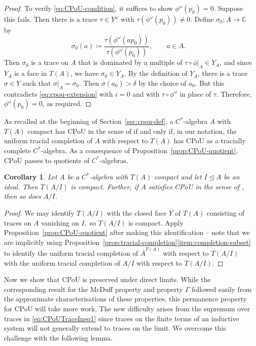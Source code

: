 \documentclass[a4paper,11pt]{amsart}
\newtheorem{corollary}[theorem]{Corollary}
\theoremstyle{definition}
\numberwithin{equation}{section}
\numberwithin{theorem}{section}
\newcommand{\completion}[2]{\overline{#1}^{#2}}
\begin{document}
\begin{proof}
	To verify \eqref{eq:CPoU-condition}, it suffices to show $\phi^\omega(p_0) = 0$.  Suppose this fails.  Then there is a trace $\tau \in Y^\omega$ with $\tau(\phi^\omega(p_0)) \neq 0$.  Define $\sigma_0 \colon A \rightarrow \mathbb C$ by
	\begin{equation}
		\sigma_0(a) \coloneqq \frac{\tau(\phi^\omega(a p_0))}{\tau(\phi^\omega(p_0))}, \qquad a \in A.
	\end{equation}
	Then $\sigma_0$ is a trace on $A$ that is dominated by a multiple of $\tau \circ \phi|_A \in Y_A$, and since $Y_A$ is a face in $T(A)$, we have $\sigma_0 \in Y_A$.  By the definition of $Y_A$, there is a trace $\sigma \in Y$ such that $\sigma|_A = \sigma_0$.  Then $\sigma(a_0) > \delta$ by the choice of $a_0$.  But this contradicts \eqref{eq:cpou-extension} with $i= 0$ and with $\tau \circ \phi^\omega$ in place of $\tau$.  Therefore, $\phi^\omega(p_0) = 0$, as required.
\end{proof}

As recalled at the beginning of Section~\ref{sec:cpou-def}, a $C^*$-algebra $A$ with $T(A)$ compact has CPoU in the sense of \cite{CETWW} if and only if, in our notation, the uniform tracial completion of $A$ with respect to $T(A)$ has CPoU as a tracially complete $C^*$-algebra.  As a consequence of Proposition~\ref{prop:CPoU-quotient}, CPoU passes to quotients of $C^*$-algebras.

\begin{corollary}\label{cor:CPoU-quotient}
	Let $A$ be a $C^*$-algebra with $T(A)$ compact and let $I \unlhd A$ be an ideal.  Then $T(A/I)$ is compact.  Further, if $A$ satisfies CPoU in the sense of \cite{CETWW}, then so does $A/I$.
\end{corollary}

\begin{proof}
We may identify $T(A/I)$ with the closed face $Y$ of $T(A)$ consisting of traces on $A$ vanishing on $I,$ so $T(A/I)$ is  compact.  Apply Proposition~\ref{prop:CPoU-quotient} after making this identification -- note that we are implicitly using Proposition~\ref{prop:tracial-completion}\ref{item:completion-subset} to identify the uniform tracial completion of $\completion{A}{T(A)}$ with respect to $T(A/I)$ with the uniform tracial completion of $A/I$ with respect to $T(A/I)$.
\end{proof}

Now we show that CPoU is preserved under direct limits.  While the corresponding result for the McDuff property and property $\Gamma$ followed easily from the approximate characterisations of these properties, this permanence property for CPoU will take more work.  The new difficulty arises from the supremum over traces in \eqref{eq:CPoUTraceIneq1} since traces on the finite terms of an inductive system will not generally extend to traces on the limit.  We overcome this challenge with the following lemma.
\end{document}

